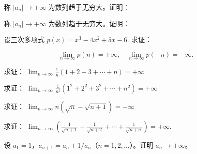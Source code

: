 \newpage
\noindent\begin{minipage}{\textwidth}
称 $|a_n|\to+\infty$ 为数列趋于无穷大。证明：
\end{minipage}\par\vfill
\noindent\begin{minipage}{\textwidth}
称 $|a_n|\to+\infty$ 为数列趋于无穷大。证明：
\end{minipage}\par\vfill
\noindent\begin{minipage}{\textwidth}
设三次多项式  $ p(x)=x^{3}-4x^{2}+5x-6 $. 求证：

\[\lim_{n\to\infty}p(n)=+\infty,\quad\lim_{n\to\infty}p(-n)=-\infty.\]
\end{minipage}\par\vfill
\newpage
\noindent\begin{minipage}{\textwidth}
求证： $ \lim_{n\to\infty}\frac{1}{n}(1+2+3+\cdots+n)=+\infty $
\end{minipage}\par\vfill
\noindent\begin{minipage}{\textwidth}
求证： $ \lim_{n\to\infty}\frac{1}{n^2}(1^2+2^2+3^2+\cdots+n^2)=+\infty $
\end{minipage}\par\vfill
\noindent\begin{minipage}{\textwidth}
求证： $ \lim_{n\to\infty}n(\sqrt{n}-\sqrt{n+1})=-\infty $
\end{minipage}\par\vfill
\newpage
\noindent\begin{minipage}{\textwidth}
求证： $ \lim_{n \to \infty} \left( \frac{1}{\sqrt{n+1}} + \frac{1}{\sqrt{n+2}} + \cdots + \frac{1}{\sqrt{n+n}} \right) = +\infty $.
\end{minipage}\par\vfill
\noindent\begin{minipage}{\textwidth}
设 $a_1=1$，$a_{n+1}=a_n+1/a_n$（$n=1,2,\ldots$）。证明 $a_n\to+\infty$。
\end{minipage}\par\vfill

